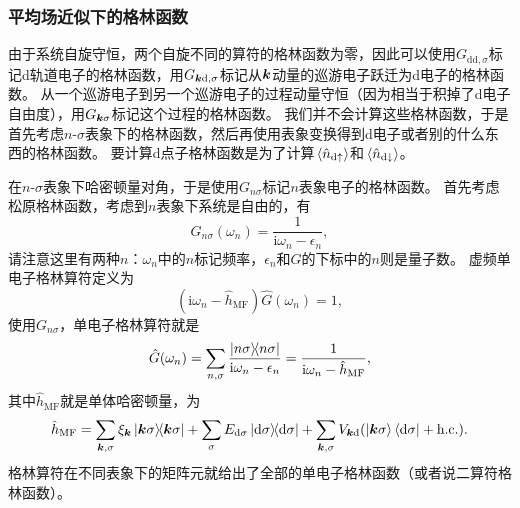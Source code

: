 \documentclass[hyperref, UTF8, a4paper]{ctexart}
\newcommand*{\ii}{\mathrm{i}}
\begin{document}
\subsubsection{平均场近似下的格林函数}

由于系统自旋守恒，两个自旋不同的算符的格林函数为零，因此可以使用$G_{\text{dd}, \sigma}$标记d轨道电子的格林函数，用$G_{\vb*{k} \text{d}, \sigma}$标记从$\vb*{k}$动量的巡游电子跃迁为d电子的格林函数。
从一个巡游电子到另一个巡游电子的过程动量守恒（因为相当于积掉了d电子自由度），用$G_{\vb*{k}\sigma}$标记这个过程的格林函数。
我们并不会计算这些格林函数，于是首先考虑$n$-$\sigma$表象下的格林函数，然后再使用表象变换得到d电子或者别的什么东西的格林函数。
要计算d点子格林函数是为了计算$\expval*{\hat{n}_{\text{d}\uparrow}}$和$\expval*{\hat{n}_{\text{d}\downarrow}}$。

在$n$-$\sigma$表象下哈密顿量对角，于是使用$G_{n\sigma}$标记$n$表象电子的格林函数。
首先考虑松原格林函数，考虑到$n$表象下系统是自由的，有
\begin{equation}
    G_{n\sigma} (\omega_n) = \frac{1}{\ii \omega_n - \epsilon_n},
\end{equation}
请注意这里有两种$n$：$\omega_n$中的$n$标记频率，$\epsilon_n$和$G$的下标中的$n$则是量子数。
虚频单电子格林算符定义为
\[
    (\ii \omega_n - \hat{h}_\text{MF}) \hat{G}(\omega_n) = 1,
\]
使用$G_{n \sigma}$，单电子格林算符就是
\begin{equation}
    \hat{G}(\omega_n) = \sum_{n, \sigma} \frac{\dyad{n\sigma}}{\ii \omega_n - \epsilon_n} = \frac{1}{\ii \omega_n - \hat{h}_\text{MF}},
\end{equation}
其中$\hat{h}_\text{MF}$就是单体哈密顿量，为
\begin{equation}
    \hat{h}_\text{MF} = \sum_{\vb*{k}, \sigma} \xi_{\vb*{k}} \dyad{\vb*{k} \sigma} + \sum_\sigma E_{\text{d} \sigma} \dyad{\text{d} \sigma} + \sum_{\vb*{k}, \sigma} V_{\vb*{k} \text{d}} ( \ket{\vb*{k} \sigma} \bra{\text{d} \sigma} + \text{h.c.} ).
    \label{eq:anderson-green-operator}
\end{equation}
格林算符在不同表象下的矩阵元就给出了全部的单电子格林函数（或者说二算符格林函数）。
\end{document}

